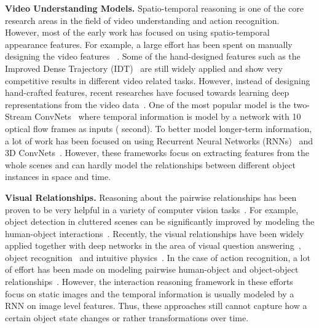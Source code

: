 \documentclass[runningheads]{llncs}
\begin{document}
\textbf{Video Understanding Models.} Spatio-temporal reasoning is one of the core research areas in the field of video understanding and action recognition. However, most of the early work has focused on using spatio-temporal appearance features. For example, a large effort has been spent on manually designing the video features ~\cite{STIP05,Wang2013a,HOG3D,MBH06,HOF,Corso12,YangGreg11,Zhuowen13,Peng14,Lan15}. Some of the hand-designed features such as the Improved Dense Trajectory (IDT)~\cite{Wang2013a} are still widely applied and show very competitive results in different video related tasks. However, instead of designing hand-crafted features, recent researches have focused towards learning deep representations from the video data~\cite{Karpathy14,Simonyan2014,TDD15,Taylor10,Le11,Zhou2017,WangXWQLTV16,Wang_Transformation}. One of the most popular model is the two-Stream ConvNets~\cite{Simonyan2014} where temporal information is model by a network with 10 optical flow frames as inputs ( second). To better model longer-term information, a lot of work has been focused on using Recurrent Neural Networks (RNNs)~\cite{Yue-HeiNg2015,Donahue2015LRCN,Srivastava15,Sun15,Wu15,li2017temporal,gan2016you,Bian2017,pan2016hierarchical} and 3D ConvNets~\cite{3DCNN,Tran15,Carreira2017,Tran18,Xie2017,Qiu17,Feichtenhofer2016}. However, these frameworks focus on extracting features from the whole scenes and can hardly model the relationships between different object instances in space and time. 

\textbf{Visual Relationships.} Reasoning about the pairwise relationships has been proven to be very helpful in a variety of computer vision tasks~\cite{Gupta09PAMI,Yao10CVPR,Yao12Det,Kumar10,russell2006using}. For example, object detection in cluttered scenes can be significantly improved by modeling the human-object interactions~\cite{Yao10CVPR}. Recently, the visual relationships have been widely applied together with deep networks in the area of visual question answering~\cite{Santoro2017}, object recognition~\cite{yatskar2016,HuCVPR18,gkioxari2017interactnet} and  intuitive physics~\cite{Battaglia2016,Watters2017}. In the case of action recognition, a lot of effort has been made on modeling pairwise human-object and object-object relationships~\cite{Ma2018,deepparts,ni2016progressively}. However, the interaction reasoning framework in these efforts focus on static images and the temporal information is usually modeled by a RNN on image level features. Thus, these approaches still cannot capture how a certain object state changes or rather transformations over time. 
\end{document}
